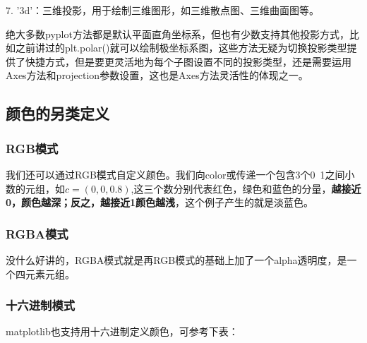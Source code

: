 \documentclass[12pt]{article}
\begin{document}
7. '3d'：三维投影，用于绘制三维图形，如三维散点图、三维曲面图等。

绝大多数pyplot方法都是默认平面直角坐标系，但也有少数支持其他投影方式，比如之前讲过的plt.polar()就可以绘制极坐标系图，这些方法无疑为切换投影类型提供了快捷方式，但是要更灵活地为每个子图设置不同的投影类型，还是需要运用Axes方法和projection参数设置，这也是Axes方法灵活性的体现之一。

\newpage
\subsection{颜色的另类定义}\label{颜色的另类定义}
\subsubsection{RGB模式}
我们还可以通过RGB模式自定义颜色。我们向color或传递一个包含3个0~1之间小数的元组，如\(c=(0,0,0.8)\),这三个数分别代表红色，绿色和蓝色的分量，\textbf{越接近0，颜色越深；反之，越接近1颜色越浅}，这个例子产生的就是淡蓝色。



\subsubsection{RGBA模式}
 没什么好讲的，RGBA模式就是再RGB模式的基础上加了一个alpha透明度，是一个四元素元组。

\subsubsection{十六进制模式}
matplotlib也支持用十六进制定义颜色，可参考下表：
\end{document}
